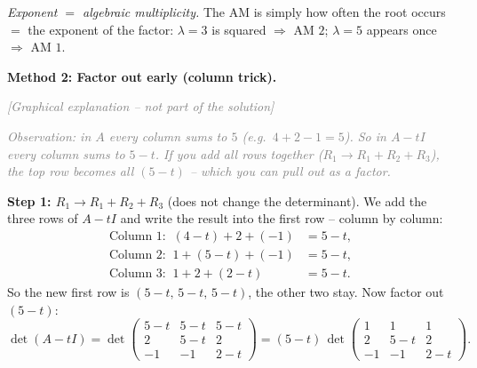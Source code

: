 \documentclass[a4paper,12pt]{article}
\newcommand{\grafik}{\textcolor{gray}{\small\textit{[Graphical explanation -- not part of the solution]}}}
\begin{document}
\emph{Exponent $=$ algebraic multiplicity.} The AM is simply how often the root occurs $=$ the exponent of the factor: $\lambda = 3$ is squared $\Rightarrow$ AM $2$; $\lambda = 5$ appears once $\Rightarrow$ AM $1$.

\bigskip

\textbf{Method 2: Factor out early (column trick).}

\grafik

\begin{center}
\end{center}

\textcolor{gray}{\small\textit{Observation: in $A$ every column sums to $5$ (e.g.\ $4+2-1 = 5$). So in $A - tI$ every column sums to $5 - t$. If you add all rows together ($R_1 \to R_1 + R_2 + R_3$), the top row becomes all $(5-t)$ -- which you can pull out as a factor.}}

\textbf{Step 1: $R_1 \to R_1 + R_2 + R_3$} (does not change the determinant). We add the three rows of $A - tI$ and write the result into the first row -- column by column:
\begin{align*}
\text{Column 1:}\;\; (4-t) + 2 + (-1) &= 5 - t, \\
\text{Column 2:}\;\; 1 + (5-t) + (-1) &= 5 - t, \\
\text{Column 3:}\;\; 1 + 2 + (2-t) &= 5 - t.
\end{align*}
So the new first row is $(5-t,\, 5-t,\, 5-t)$, the other two stay. Now factor out $(5-t)$:
\[
\det(A - tI) = \det\!\begin{pmatrix} 5-t & 5-t & 5-t \\ 2 & 5-t & 2 \\ -1 & -1 & 2-t \end{pmatrix}
= (5-t)\,\det\!\begin{pmatrix} 1 & 1 & 1 \\ 2 & 5-t & 2 \\ -1 & -1 & 2-t \end{pmatrix}.
\]
\end{document}
